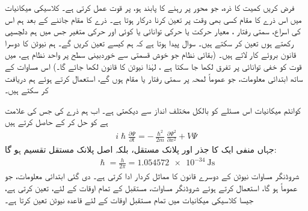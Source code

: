 فرض کریں  کمیت   کا ذرہ، جو   محور پر رہنے کا پابند ہو، پر قوت  عمل کرتی ہے۔ کلاسیکی میکانیات میں اس ذرے کا مقام   کسی بھی وقت  پر تعین کرنا درکار ہوتا ہے۔ ذرے کا مقام جاننے کے بعد ہم اس کی اسراع، سمتی رفتار  ، معیار حرکت   یا حرکی توانائی   یا کوئی اور حرکی متغیر جس میں ہم دلچسپی رکھتے ہوں تعین کر سکتے ہیں۔  سوال پیدا ہوتا ہے کہ ہم  کیسے تعین  کریں گے۔ ہم نیوٹن کا دوسرا قانون    بروئے کار لاتے ہیں۔ (بقائی نظام جو خوش قسمتی سے خوردبینی سطح پر واحد نظام ہے، میں قوت کو خفی توانائی پر تفرق لکھا جا سکتا ہے ،  لہٰذا نیوٹن کا قانون   لکھا جائے گا۔)   اس مساوات کے ساتھ ابتدائی معلومات، جو عموماً لمحہ  پر سمتی رفتار یا مقام ہوں گے، استعمال کرتے ہوئے ہم   دریافت کر سکتے ہیں۔
 
کوانٹم میکانیات اس مسئلے کو بالکل مختلف انداز سے دیکھتی  ہے۔ اب ہم ذرے کی  جس کی علامت  ہے  کو  حل کر کے حاصل کرتے ہیں
\begin{align}
 i \hslash \frac{\partial \Psi}{\partial t} = - \frac{\hslash^{2}}{2m} \frac{\partial \Psi^{2}}{\partial x^{2}} + V \Psi
\end{align}
جہاں    منفی ایک  کا جذر  اور   پلانک  مستقل، بلکہ اصل پلانک مستقل تقسیم     ہو گا: 
\begin{align}
 \hslash = \frac{h}{2\pi} = \SI{1.054572e-34}{\joule\second} 
\end{align}
شروڈنگر  مساوات نیوٹن کے دوسرے قانون کا مماثل کردار ادا کرتی ہے۔ دی گئی ابتدائی معلومات، جو عموماً   ہو گا، استعمال کرتے ہوئے  شروڈنگر مساوات،  مستقبل کے تمام اوقات کے لئے،  تعین کرتی ہے، جیسا  کلاسیکی میکانیات میں تمام مستقبل اوقات کے لئے  قاعدہ نیوٹن    تعین کرتا ہے۔ 
 


